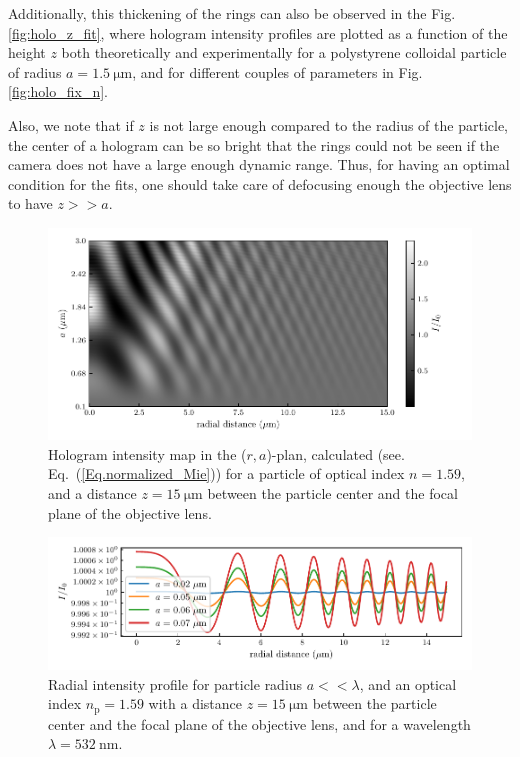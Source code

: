 Additionally, this thickening of the rings can also be observed in the Fig.\ref{fig:holo_z_fit}, where hologram intensity profiles are plotted as a function of the height $z$ both theoretically and experimentally for a polystyrene colloidal particle of radius  $a = 1.5 ~ \mathrm{\mu m} $, and for different couples of parameters in Fig.\ref{fig:holo_fix_n}.

Also, we note that if $z$ is not large enough compared to the radius of the particle, the center of a hologram can be so bright that the rings could not be seen if the camera does not have a large enough dynamic range.  Thus, for having an optimal condition for the fits, one should take care of defocusing enough the objective lens to have $z >> a$.





\begin{figure}
	\centering
	\includegraphics{02_body/chapter2/images/holo_size_exemple/holos_only_r.pdf}
	\caption{Hologram intensity map in the ($r,a$)-plan, calculated (see. Eq.~(\ref{Eq.normalized_Mie})) for a particle of optical index $n = 1.59$, and a distance $z = 15 ~\mathrm{\mu m}$ between the particle center and the focal plane of the objective lens.~\href{https://github.com/eXpensia/Confined-Brownian-Motion/blob/main/02_body/chapter2/images/holo_size_exemple/holosize_variation.ipynb}{\faGithub}}
	\label{fig:holo_onlyr}
\end{figure}

\begin{figure}[H]
	\centering
	\includegraphics{02_body/chapter2/images/holo_size_exemple/smallparticles.pdf}
	\caption{Radial intensity profile for particle radius $a << \lambda$, and an optical index $n_\mathrm{p} = 1.59$ with a distance $z = 15 ~\mathrm{\mu m}$ between the particle center and the focal plane of the objective lens, and for a wavelength $\lambda = 532 ~ \mathrm{nm}$.~\href{https://github.com/eXpensia/Confined-Brownian-Motion/blob/main/02_body/chapter2/images/holo_size_exemple/holosize_variation.ipynb}{\faGithub}}
	\label{fig:small_part_holo}
\end{figure}


